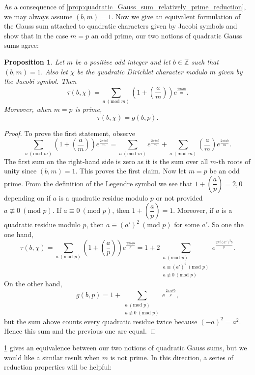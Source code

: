 \documentclass[12pt]{book}
\newtheorem{proposition}{Proposition}[section]
\theoremstyle{definition}\newframedtheorem{method}{Method}
\newcommand{\legendre}[2]{\genfrac{(}{)}{0.5pt}{0}{#1}{#2}}
\newcommand{\tmod}[1]{\ \left(\text{mod }#1\right)}
\newcommand{\Z}{\mathbb{Z}}
\newcommand{\<}{\langle}
\renewcommand{\>}{\rangle}
\begin{document}
      As a consequence of \cref{prop:quadratic_Gauss_sum_relatively_prime_reduction}, we may always assume $(b,m) = 1$. Now we give an equivalent formulation of the Gauss sum attached to quadratic characters given by Jacobi symbols and show that in the case $m = p$ an odd prime, our two notions of quadratic Gauss sums agree:

      \begin{proposition}\label{prop:Gauss_sum_equivalence_for_primes}
        Let $m$ be a positive odd integer and let $b \in \Z$ such that $(b,m) = 1$. Also let $\chi$ be the quadratic Dirichlet character modulo $m$ given by the Jacobi symbol. Then
        \[
          \tau(b,\chi) = \sum_{a \tmod{m}}\left(1+\legendre{a}{m}\right)e^{\frac{2\pi iab}{m}}.
        \]
        Moreover, when $m = p$ is prime,
        \[
          \tau(b,\chi) = g(b,p).
        \]
      \end{proposition}
      \begin{proof}
        To prove the first statement, observe
        \[
          \sum_{a \tmod{m}}\left(1+\legendre{a}{m}\right)e^{\frac{2\pi iab}{m}} = \sum_{a \tmod{m}}e^{\frac{2\pi iab}{m}}+\sum_{a \tmod{m}}\legendre{a}{m}e^{\frac{2\pi iab}{m}}.
        \]
        The first sum on the right-hand side is zero as it is the sum over all $m$-th roots of unity since $(b,m) = 1$. This proves the first claim. Now let $m = p$ be an odd prime. From the definition of the Legendre symbol we see that $1+\legendre{a}{p} = 2,0$ depending on if $a$ is a quadratic residue modulo $p$ or not provided $a \not\equiv 0 \tmod{p}$. If $a \equiv 0 \tmod{p}$, then $1+\legendre{a}{p} = 1$. Moreover, if $a$ is a quadratic residue modulo $p$, then $a \equiv (a')^{2} \tmod{p}$ for some $a'$. So one the one hand,
        \[
          \tau(b,\chi) = \sum_{a \tmod{p}}\left(1+\legendre{a}{p}\right)e^{\frac{2\pi iab}{p}} = 1+2\sum_{\substack{a \tmod{p} \\ a \equiv (a')^{2} \tmod{p} \\ a \not\equiv 0 \tmod{p}}}e^{\frac{2\pi i(a')^{2}b}{p}}.
        \]
        On the other hand,
        \[
          g(b,p) = 1+\sum_{\substack{a \tmod{p} \\ a \not\equiv 0 \tmod{p}}}e^{\frac{2\pi ia^{2}b}{p}},
        \]
        but the sum above counts every quadratic residue twice because $(-a)^{2} = a^{2}$. Hence this sum and the previous one are equal.
      \end{proof}

      \cref{prop:Gauss_sum_equivalence_for_primes} gives an equivalence between our two notions of quadratic Gauss sums, but we would like a similar result when $m$ is not prime. In this direction, a series of reduction properties will be helpful:
\end{document}
